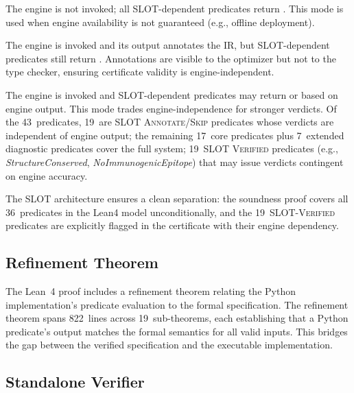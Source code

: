 \begin{description}[leftmargin=!,labelwidth=2.8cm,itemsep=1pt,topsep=1pt]
\item[SLOT \textsc{Skip}:]
The engine is not invoked; all SLOT-dependent predicates return
\UNCERTAIN.  This mode is used when engine availability is not
guaranteed (e.g., offline deployment).

\item[SLOT \textsc{Annotate}:]
The engine is invoked and its output annotates the IR, but
SLOT-dependent predicates still return \UNCERTAIN.  Annotations are
visible to the optimizer but not to the type checker, ensuring
certificate validity is engine-independent.

\item[SLOT \textsc{Verified}:]
The engine is invoked and SLOT-dependent predicates may return \PASS{}
or \FAIL{} based on engine output.  This mode trades engine-independence
for stronger verdicts.  Of the 43~predicates, 19~are SLOT
\textsc{Annotate}/\textsc{Skip} predicates whose verdicts are
independent of engine output; the remaining 17~core predicates plus
7~extended diagnostic predicates cover the full system;
19~SLOT \textsc{Verified}
predicates (e.g., \emph{StructureConserved}, \emph{NoImmunogenicEpitope})
that may issue \PASS{} verdicts contingent on engine accuracy.
\end{description}

The SLOT architecture ensures a clean separation: the soundness proof
covers all 36~predicates in the Lean4 model unconditionally, and
the 19~SLOT-\textsc{Verified} predicates are explicitly flagged in the
certificate with their engine dependency.

\subsection{Refinement Theorem}

The Lean~4 proof includes a refinement theorem relating the Python
implementation's predicate evaluation to the formal specification.  The
refinement theorem spans 822~lines across 19~sub-theorems, each
establishing that a Python predicate's output matches the formal
semantics for all valid inputs.  This bridges the gap between the
verified specification and the executable implementation.

\subsection{Standalone Verifier}

